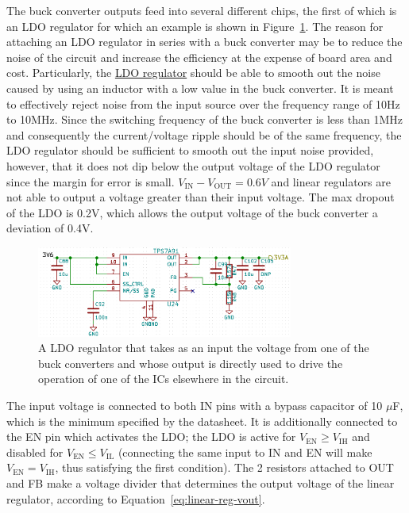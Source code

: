 The buck converter outputs feed into several different chips, the first of which is an LDO regulator
for which an example is shown in Figure~\ref{fig:linear-reg}. The reason for attaching an LDO
regulator in series with a buck converter may be to reduce the noise of the circuit and increase the
efficiency at the expense of board area and cost. Particularly, the
\href{http://www.ti.com/lit/ds/symlink/tps7a91.pdf}{LDO regulator} should be able to smooth out the
noise caused by using an inductor with a low value in the buck converter. It is meant to effectively
reject noise from the input source over the frequency range of 10Hz to 10MHz. Since the switching
frequency of the buck converter is less than 1MHz and consequently the current/voltage ripple should
be of the same frequency, the LDO regulator should be sufficient to smooth out the input noise
provided, however, that it does not dip below the output voltage of the LDO regulator since the
margin for error is small. $V_{\text{IN}}-V_{\text{OUT}}=0.6V$ and linear regulators are not able to
output a voltage greater than their input voltage. The max dropout of the LDO is 0.2V, which allows
the output voltage of the buck converter a deviation of 0.4V.

\begin{figure}[h]
  \centering
  \includegraphics[width=0.75\textwidth]{data/linear-reg.png}
  \caption{A LDO regulator that takes as an input the voltage from one of the buck converters and
    whose output is directly used to drive the operation of one of the ICs elsewhere in the
    circuit.}
  \label{fig:linear-reg}
\end{figure}

The input voltage is connected to both IN pins with a bypass capacitor of 10 $\mu$F, which is the
minimum specified by the datasheet. It is additionally connected to the EN pin which activates the
LDO; the LDO is active for $V_{\text{EN}} \geq V_{\text{IH}}$ and disabled for
$V_{\text{EN}} \leq V_{\text{IL}}$ (connecting the same input to IN and EN will make
$V_{\text{EN}} = V_{\text{IH}}$, thus satisfying the first condition). The 2 resistors attached to
OUT and FB make a voltage divider that determines the output voltage of the linear regulator,
according to Equation~\ref{eq:linear-reg-vout}.

